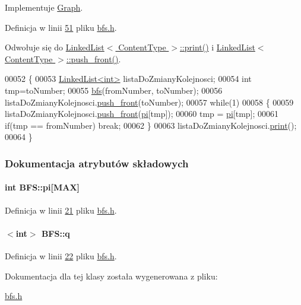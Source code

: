 Implementuje \hyperlink{class_graph_adf2b7f7e78c0ac66f7f604021133561e}{Graph}.



Definicja w linii \hyperlink{bfs_8h_source_l00051}{51} pliku \hyperlink{bfs_8h_source}{bfs.\-h}.



Odwołuje się do \hyperlink{linkedlist_8h_source_l00144}{Linked\-List$<$ Content\-Type $>$\-::print()} i \hyperlink{linkedlist_8h_source_l00113}{Linked\-List$<$ Content\-Type $>$\-::push\-\_\-front()}.


\begin{DoxyCode}
00052     \{
00053         \hyperlink{class_linked_list}{LinkedList<int>} listaDoZmianyKolejnosci;
00054         \textcolor{keywordtype}{int} tmp=toNumber;
00055         \hyperlink{class_b_f_s_a392b91df16399ab3be7e3745379d9dc0}{bfs}(fromNumber, toNumber);
00056         listaDoZmianyKolejnosci.\hyperlink{class_linked_list_a9effa3698ad28e2f3401cd199f852e08}{push\_front}(toNumber);
00057         \textcolor{keywordflow}{while}(1)
00058         \{
00059                 listaDoZmianyKolejnosci.\hyperlink{class_linked_list_a9effa3698ad28e2f3401cd199f852e08}{push\_front}(\hyperlink{class_b_f_s_a1191eb3076bf8f3f412cc68563c0b46f}{pi}[tmp]);
00060                 tmp = \hyperlink{class_b_f_s_a1191eb3076bf8f3f412cc68563c0b46f}{pi}[tmp];
00061                 \textcolor{keywordflow}{if}(tmp == fromNumber) \textcolor{keywordflow}{break};
00062         \}
00063         listaDoZmianyKolejnosci.\hyperlink{class_linked_list_a245ba50906c85c1765a5f611d3f3b6c0}{print}();
00064     \}
\end{DoxyCode}


\subsubsection{Dokumentacja atrybutów składowych}
\hypertarget{class_b_f_s_a1191eb3076bf8f3f412cc68563c0b46f}{
\paragraph[{pi}]{\setlength{\rightskip}{0pt plus 5cm}int B\-F\-S\-::pi\mbox{[}{\bf M\-A\-X}\mbox{]}}}\label{class_b_f_s_a1191eb3076bf8f3f412cc68563c0b46f}


Definicja w linii \hyperlink{bfs_8h_source_l00021}{21} pliku \hyperlink{bfs_8h_source}{bfs.\-h}.

\hypertarget{class_b_f_s_a317da6453a9b8e73f62e2bc60e9894fa}{
\paragraph[{q}]{$<$int$>$ B\-F\-S\-::q}}\label{class_b_f_s_a317da6453a9b8e73f62e2bc60e9894fa}


Definicja w linii \hyperlink{bfs_8h_source_l00022}{22} pliku \hyperlink{bfs_8h_source}{bfs.\-h}.



Dokumentacja dla tej klasy została wygenerowana z pliku\-:\begin{DoxyCompactItemize}
\item 
\hyperlink{bfs_8h}{bfs.\-h}\end{DoxyCompactItemize}
